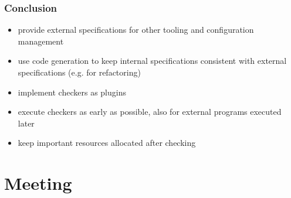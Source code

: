 \begin{frame}
	\frametitle{Conclusion}

	\begin{itemize}[<+-| alert@+>]
	\item provide external specifications for other tooling and configuration management
	\item use code generation to keep internal specifications consistent with external specifications (e.g. for refactoring)
	\item implement checkers as plugins
	\item execute checkers as early as possible,
	also for external programs executed later
	\item keep important resources allocated after checking
	\end{itemize}
\end{frame}

\section{Meeting}



\appendix

\begin{frame}[allowframebreaks]
	
	
\end{frame}




